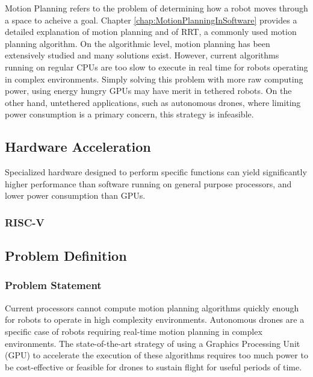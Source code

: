         Motion Planning refers to the problem of determining how a robot moves through a space to acheive a goal. Chapter \ref{chap:MotionPlanningInSoftware} provides a detailed explanation of motion planning and of \ac{RRT}, a commonly used motion planning algorithm.
        \newline
        On the algorithmic level, motion planning has been extensively studied and many solutions exist. However, current algorithms running on regular \ac{CPU}s are too slow to execute in real time for robots operating in complex environments. Simply solving this problem with more raw computing power, using energy hungry \ac{GPU}s may have merit in tethered robots. On the other hand, untethered applications, such as autonomous drones, where limiting power consumption is a primary concern, this strategy is infeasible.
        
    \subsection*{Hardware Acceleration}
        Specialized hardware designed to perform specific functions can yield significantly higher performance than software running on general purpose processors, and lower power consumption than \ac{GPU}s.

    \subsubsection{RISC-V}


\subsection{Problem Definition}

    \subsubsection*{Problem Statement}
    Current processors cannot compute motion planning algorithms quickly enough for robots to operate in high complexity environments. Autonomous drones are a specific case of robots requiring real-time motion planning in complex environments. The state-of-the-art strategy of using a Graphics Processing Unit (GPU) to accelerate the execution of these algorithms requires too much power to be cost-effective or feasible for drones to sustain flight for useful periods of time.

